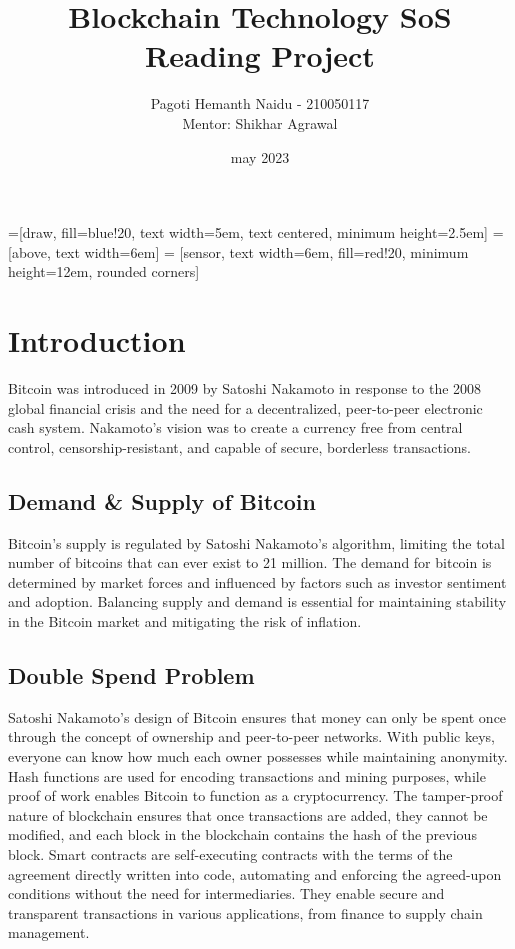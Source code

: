 \documentclass{article}
\title{Blockchain Technology SoS Reading Project}
\author{Pagoti Hemanth Naidu - 210050117 \\
Mentor: Shikhar Agrawal}
\date{may 2023}
\begin{document}
=[draw, fill=blue!20, text width=5em, 
text centered, minimum height=2.5em]
 = [above, text width=6em]
 = [sensor, text width=6em, fill=red!20, 
minimum height=12em, rounded corners]
\def\blockdist{2.3}
\def\edgedist{1}
\maketitle
\tableofcontents
\newpage
\section{Introduction}

Bitcoin was introduced in 2009 by Satoshi Nakamoto in response to the 2008 global financial crisis and the need for a decentralized, peer-to-peer electronic cash system. 
Nakamoto's vision was to create a currency free from central control, censorship-resistant, and capable of secure, borderless transactions.
\subsection{Demand \& Supply of Bitcoin}
Bitcoin's supply is regulated by Satoshi Nakamoto's algorithm, limiting the total number of bitcoins that can ever exist to 21 million.
The demand for bitcoin is determined by market forces and influenced by factors such as investor sentiment and adoption. 
Balancing supply and demand is essential for maintaining stability in the Bitcoin market and mitigating the risk of inflation.
\subsection{Double Spend Problem}
Satoshi Nakamoto's design of Bitcoin ensures that money can only be spent once through the concept of ownership and peer-to-peer networks. With public keys, everyone can know how much each owner possesses while maintaining anonymity. 
Hash functions are used for encoding transactions and mining purposes, while proof of work enables Bitcoin to function as a cryptocurrency. 
The tamper-proof nature of blockchain ensures that once transactions are added, they cannot be modified, and each block in the blockchain contains the hash of the previous block.
Smart contracts are self-executing contracts with the terms of the agreement directly written into code, automating and enforcing the agreed-upon conditions without the need for intermediaries. 
They enable secure and transparent transactions in various applications, from finance to supply chain management.
\end{document}
